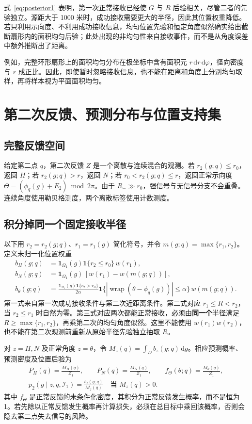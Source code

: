 \documentclass[UTF8,a4paper,zihao=-4,fontset=none]{ctexart}
\numberwithin{equation}{section}
\theoremstyle{definition}
\newcommand{\ind}{\mathbf 1}
\newcommand{\dd}{\,\mathrm d}
\newcommand{\wrap}{\operatorname{wrap}}
\begin{document}
式~\eqref{eq:posterior1} 表明，第一次正常接收已经使 \(G\) 与 \(R\) 后验相关，尽管二者的先验独立。源距大于 1000 米时，成功接收需要更大的半径，因此其位置权重降低。若只利用示向度、不利用成功接收信息，均匀位置先验和恒定角度似然确实给出截断扇形内的面积均匀后验；此处出现的非均匀性来自接收事件，而不是从角度误差中额外推断出了距离。

例如，完整环形扇形上的面积均匀分布在极坐标中含有面积元 \(r\dd r\dd\varphi\)，径向密度与 \(r\) 成正比。因此，即使暂时忽略接收信息，也不能在距离和角度上分别均匀取样，再将样本视为平面面积均匀。

\section{第二次反馈、预测分布与位置支持集}
\subsection{完整反馈空间}
给定第二点 \(q\)，第二次反馈 \(Z\) 是一个离散与连续混合的观测。若 \(r_2(g;q)\le r_0\)，返回 \(H\)；若 \(r_2(g;q)>r\)，返回 \(N\)；若 \(r_0<r_2(g;q)\le r\)，返回正常示向度 \(\Theta=(\phi_q(g)+E_2)\bmod2\pi\)。由于 \(R_-\gg r_0\)，强信号与无信号分支不会重叠。连续角度使用勒贝格测度，两个离散标签使用计数测度。

\subsection{积分掉同一个固定接收半径}
以下用 \(r_2=r_2(g;q)\)、\(r_1=r_1(g)\) 简化符号，并令 \(m(g;q)=\max\{r_1,r_2\}\)。定义未归一化位置权重
\begin{equation}\label{eq:bweights}
\begin{aligned}
b_H(g;q)&=\ind_{\Omega_1}(g)\ind\{r_2\le r_0\}\,w(r_1),\\
b_N(g;q)&=\ind_{\Omega_1}(g)\,[w(r_1)-w(m(g;q))],\\
b_\theta(g;q)&=\frac{\ind_{\Omega_1}(g)\ind\{r_2>r_0\}}{2\alpha}
\ind\{|\wrap(\theta-\phi_q(g))|\le\alpha\}\,w(m(g;q)).
\end{aligned}
\end{equation}
第一式来自第一次成功接收条件与第二次近距离条件。第二式对应 \(r_1\le R<r_2\)，当 \(r_2\le r_1\) 时自然为零。第三式对应两次都能正常接收，必须由\textbf{同一个}半径满足 \(R\ge\max\{r_1,r_2\}\)，再乘第二次的均匀角度似然。这里不能使用 \(w(r_1)w(r_2)\)，也不能在第二次观测前重新从原始半径先验独立抽取 \(R\)。

对 \(z=H,N\) 及正常角度 \(z=\theta\)，令 \(M_z(q)=\int_D b_z(g;q)\dd g\)。相应预测概率、预测密度及位置后验为
\begin{equation}\label{eq:prediction}
\begin{gathered}
P_H(q)=\frac{M_H(q)}{Z_1},\qquad
P_N(q)=\frac{M_N(q)}{Z_1},\qquad
f_\Theta(\theta;q)=\frac{M_\theta(q)}{Z_1},\\
p_2(g\mid z,q,\mathcal I_1)=\frac{b_z(g;q)}{M_z(q)}\quad\text{当 }M_z(q)>0.
\end{gathered}
\end{equation}
其中 \(f_\Theta\) 是正常反馈的未条件化密度，其积分为正常反馈发生概率，而不是恒为 1。若先除以正常反馈发生概率再计算损失，必须在总目标中乘回该概率，否则会隐去第二点失去信号的风险。
\end{document}
